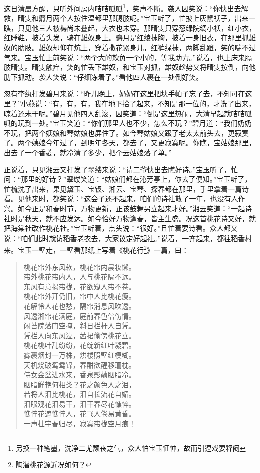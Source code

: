 \documentclass[12pt,oneside]{book}
\newenvironment{shici}{%
\begin{verse}%
\centering\large\hspace{12pt}}%
{\end{verse}}
\begin{document}
这日清晨方醒，只听外间房内咭咭呱呱\footnote{另换一种笔墨，洗净二尤颓丧之气，众人怕宝玉怔忡，故而引逗戏耍释闷}，笑声不断。袭人因笑说：“你快出去解救，晴雯和麝月两个人按住温都里那膈肢呢。”宝玉听了，忙披上灰鼠袄子，出来一瞧，只见他三人被褥尚未叠起，大衣也未穿。那晴雯只穿葱绿院绸小袄，红小衣，红睡鞋，披着头发，骑在雄奴身上。麝月是红绫抹胸，披着一身旧衣，在那里抓雄奴的肋肢。雄奴却仰在炕上，穿着撒花紧身儿，红裤绿袜，两脚乱蹬，笑的喘不过气来。宝玉忙上前笑说：“两个大的欺负一个小的，等我助力。”说着，也上床来膈肢晴雯。晴雯触痒，笑的忙丢下雄奴，和宝玉对抓，雄奴趁势又将晴雯按倒，向他肋下抓动。袭人笑说：“仔细冻着了。”看他四人裹在一处倒好笑。

忽有李纨打发碧月来说：“昨儿晚上，奶奶在这里把块手帕子忘了去，不知可在这里？”小燕说：“有，有，有，我在地下拾了起来，不知是那一位的，才洗了出来，晾着还未干呢。”碧月见他四人乱滚，因笑道：“倒是这里热闹，大清早起就咭咭呱呱的玩到一处。”宝玉笑道：“你们那里人也不少，怎么不玩？”碧月道：“我们奶奶不玩，把两个姨娘和琴姑娘也屏住了。如今琴姑娘又跟了老太太前头去，更寂寞了。两个姨娘今年过了，到明年冬天，都去了，又更寂寞呢。你瞧，宝姑娘那里，出去了一个香菱，就冷清了多少，把个云姑娘落了单。”

正说着，只见湘云又打发了翠缕来说：“请二爷快出去瞧好诗。”宝玉听了，忙问：“那里的好诗？”翠缕笑道：“姑娘们都在沁芳亭上，你去了便知。”宝玉听了，忙梳洗了出来，果见黛玉、宝钗、湘云、宝琴、探春都在那里，手里拿着一篇诗看。见他来时，都笑说：“这会子还不起来，咱们的诗社散了一年，也没有人作兴。如今正是和春时节，万物更新，正该鼓舞另立起来才好。”湘云笑道：“一起诗社时是秋天，就不应发达。如今恰好万物逢春，皆主生盛。况这首桃花诗又好，就把海棠社改作桃花社。”宝玉听着，点头说：“很好。”且忙着要诗看。众人都又说：“咱们此时就访稻香老农去，大家议定好起社。”说着，一齐起来，都往稻香村来。宝玉一壁走，一壁看那纸上写着《桃花行\footnote{陶潜桃花源近况如何？}》一篇，曰：

\begin{shici}
桃花帘外东风软，桃花帘内晨妆懒。\\
帘外桃花帘内人，人与桃花隔不远。\\
东风有意揭帘栊，花欲窥人帘不卷。\\
桃花帘外开仍旧，帘中人比桃花瘦。\\
花解怜人花也愁，隔帘消息风吹透。\\
风透湘帘花满庭，庭前春色倍伤情。\\
闲苔院落门空掩，斜日栏杆人自凭。\\
凭栏人向东风泣，茜裙偷傍桃花立。\\
桃花桃叶乱纷纷，花绽新红叶凝碧。\\
雾裹烟封一万株，烘楼照壁红模糊。\\
天机烧破鸳鸯锦，春酣欲醒移珊枕。\\
侍女金盆进水来，香泉影蘸胭脂冷。\\
胭脂鲜艳何相类？花之颜色人之泪，\\
若将人泪比桃花，泪自长流花自媚。\\
泪眼观花泪易干，泪干春尽花憔悴。\\
憔悴花遮憔悴人，花飞人倦易黄昏。\\
一声杜宇春归尽，寂寞帘栊空月痕！
\end{shici}
\end{document}
